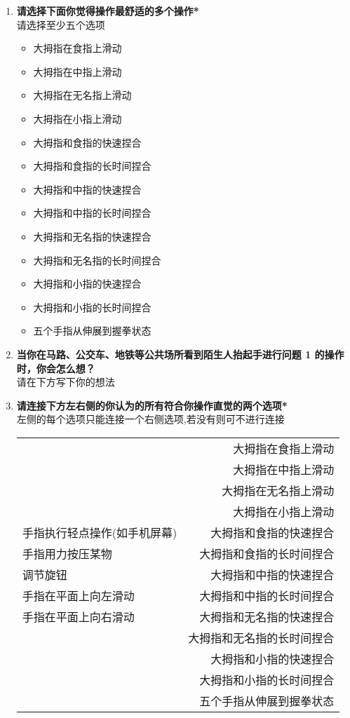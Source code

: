   \begin{enumerate}
      \kaishu
      \item \textbf{请选择下面你觉得操作最舒适的多个操作*}\\
      请选择至少五个选项
      \begin{itemize}
          \item 大拇指在食指上滑动
          \item 大拇指在中指上滑动
          \item 大拇指在无名指上滑动
          \item 大拇指在小指上滑动
          \item 大拇指和食指的快速捏合
          \item 大拇指和食指的长时间捏合
          \item 大拇指和中指的快速捏合
          \item 大拇指和中指的长时间捏合
          \item 大拇指和无名指的快速捏合
          \item 大拇指和无名指的长时间捏合
          \item 大拇指和小指的快速捏合
          \item 大拇指和小指的长时间捏合
          \item 五个手指从伸展到握拳状态
      \end{itemize}
      \item \textbf{当你在马路、公交车、地铁等公共场所看到陌生人抬起手进行问题 1 的操作时，你会怎么想？}\\
      请在下方写下你的想法
      \item \textbf{请连接下方左右侧的你认为的所有符合你操作直觉的两个选项*}\\
      左侧的每个选项只能连接一个右侧选项,若没有则可不进行连接

      \begin{tabular}{ l r }
       ~ & 大拇指在食指上滑动 \\[-3pt]
       ~ & 大拇指在中指上滑动 \\[-3pt]
       ~ & 大拇指在无名指上滑动 \\[-3pt]
       ~ & 大拇指在小指上滑动 \\[-3pt]
      手指执行轻点操作(如手机屏幕) & 大拇指和食指的快速捏合 \\[-3pt]
      手指用力按压某物 & 大拇指和食指的长时间捏合 \\[-3pt]
      调节旋钮 & 大拇指和中指的快速捏合 \\[-3pt]
      手指在平面上向左滑动 & 大拇指和中指的长时间捏合 \\[-3pt]
      手指在平面上向右滑动 & 大拇指和无名指的快速捏合 \\[-3pt]
       ~ & 大拇指和无名指的长时间捏合 \\[-3pt]
       ~ & 大拇指和小指的快速捏合 \\[-3pt]
       ~ & 大拇指和小指的长时间捏合 \\[-3pt]
       ~ & 五个手指从伸展到握拳状态 \\[-3pt]
      \end{tabular}
  \end{enumerate}

